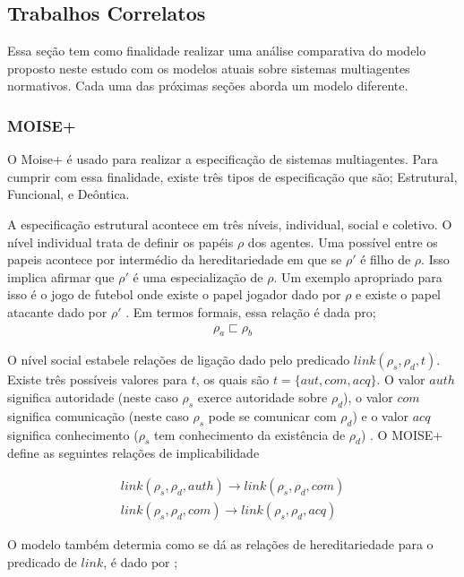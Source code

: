 \documentclass[12pt]{article}
\begin{document}
\subsection{Trabalhos Correlatos}

Essa seção tem como finalidade realizar uma análise comparativa do modelo proposto neste estudo com os modelos atuais sobre sistemas multiagentes normativos. Cada uma das próximas seções aborda um modelo diferente.

\subsubsection{MOISE+}

O Moise+ é usado para realizar a especificação de sistemas multiagentes. Para cumprir com essa finalidade, existe três tipos de especificação que são; Estrutural, Funcional, e Deôntica. 

A especificação estrutural acontece em três níveis, individual, social e coletivo. O nível individual trata de definir os papéis $\rho$ dos agentes. Uma possível entre os papeis acontece por intermédio da hereditariedade em que se $\rho'$ é filho de $\rho$. Isso implica afirmar que $\rho'$ é uma especialização de $\rho$. Um exemplo apropriado para isso é o jogo de futebol onde existe o papel jogador dado por $\rho$ e existe o papel atacante dado por $\rho'$ \cite{mosieframework}. Em termos formais, essa relação é dada pro; 
\begin{eqnarray}\nonumber
\rho_a \sqsubset \rho_b
\end{eqnarray}

O nível social estabele relações de ligação dado pelo predicado $link(\rho_s,\rho_d,t)$. Existe três possíveis valores para $t$, os quais são $t = \{aut, com, acq\}$. O valor $auth$ significa autoridade (neste caso $\rho_s$ exerce autoridade sobre $\rho_d$), o valor $com$ significa comunicação (neste caso $\rho_s$ pode se comunicar com $\rho_d$) e o valor $acq$ significa conhecimento ($\rho_s$ tem conhecimento da existência de $\rho_d$) \cite{mosieframework}. O MOISE+ define as seguintes relações de implicabilidade

\begin{eqnarray}\nonumber
	link(\rho_s,\rho_d,auth) \to link(\rho_s,\rho_d,com) \nonumber \\
	link(\rho_s,\rho_d,com) \to link(\rho_s,\rho_d,acq) 
\end{eqnarray}

O modelo também determia como se dá as relações de hereditariedade para o predicado de $link$, é dado por \cite{mosieframework}; 
\end{document}
